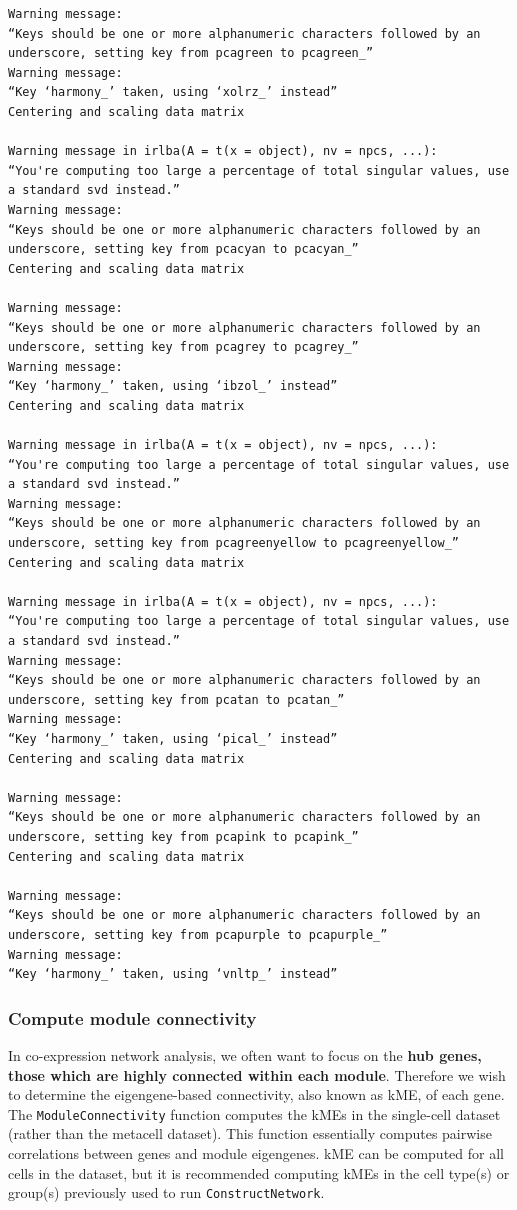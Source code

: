 \documentclass[
  letterpaper,
  DIV=11,
  numbers=noendperiod]{scrartcl}
\begin{document}
\begin{verbatim}
Warning message:
“Keys should be one or more alphanumeric characters followed by an underscore, setting key from pcagreen to pcagreen_”
Warning message:
“Key ‘harmony_’ taken, using ‘xolrz_’ instead”
Centering and scaling data matrix

Warning message in irlba(A = t(x = object), nv = npcs, ...):
“You're computing too large a percentage of total singular values, use a standard svd instead.”
Warning message:
“Keys should be one or more alphanumeric characters followed by an underscore, setting key from pcacyan to pcacyan_”
Centering and scaling data matrix

Warning message:
“Keys should be one or more alphanumeric characters followed by an underscore, setting key from pcagrey to pcagrey_”
Warning message:
“Key ‘harmony_’ taken, using ‘ibzol_’ instead”
Centering and scaling data matrix

Warning message in irlba(A = t(x = object), nv = npcs, ...):
“You're computing too large a percentage of total singular values, use a standard svd instead.”
Warning message:
“Keys should be one or more alphanumeric characters followed by an underscore, setting key from pcagreenyellow to pcagreenyellow_”
Centering and scaling data matrix

Warning message in irlba(A = t(x = object), nv = npcs, ...):
“You're computing too large a percentage of total singular values, use a standard svd instead.”
Warning message:
“Keys should be one or more alphanumeric characters followed by an underscore, setting key from pcatan to pcatan_”
Warning message:
“Key ‘harmony_’ taken, using ‘pical_’ instead”
Centering and scaling data matrix

Warning message:
“Keys should be one or more alphanumeric characters followed by an underscore, setting key from pcapink to pcapink_”
Centering and scaling data matrix

Warning message:
“Keys should be one or more alphanumeric characters followed by an underscore, setting key from pcapurple to pcapurple_”
Warning message:
“Key ‘harmony_’ taken, using ‘vnltp_’ instead”
\end{verbatim}

\hypertarget{compute-module-connectivity}{%
\subsubsection{Compute module
connectivity}\label{compute-module-connectivity}}

In co-expression network analysis, we often want to focus on the
\textbf{hub genes, those which are highly connected within each module}.
Therefore we wish to determine the eigengene-based connectivity, also
known as kME, of each gene. The \texttt{ModuleConnectivity} function
computes the kMEs in the single-cell dataset (rather than the metacell
dataset). This function essentially computes pairwise correlations
between genes and module eigengenes. kME can be computed for all cells
in the dataset, but it is recommended computing kMEs in the cell type(s)
or group(s) previously used to run \texttt{ConstructNetwork}.
\end{document}
